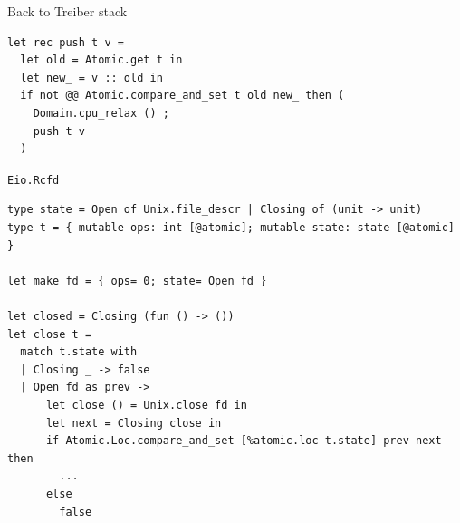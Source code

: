 \begin{frame}[fragile]{Back to Treiber stack}
\Large
\begin{verbatim}
let rec push t v =
  let old = Atomic.get t in
  let new_ = v :: old in
  if not @@ Atomic.compare_and_set t old new_ then (
    Domain.cpu_relax () ;
    push t v
  )
\end{verbatim}
\end{frame}

\begin{frame}[fragile]{\texttt{Eio.Rcfd}}
\begin{verbatim}
type state = Open of Unix.file_descr | Closing of (unit -> unit)
type t = { mutable ops: int [@atomic]; mutable state: state [@atomic] }

let make fd = { ops= 0; state= Open fd }

let closed = Closing (fun () -> ())
let close t =
  match t.state with
  | Closing _ -> false
  | Open fd as prev ->
      let close () = Unix.close fd in
      let next = Closing close in
      if Atomic.Loc.compare_and_set [%atomic.loc t.state] prev next then
        ...
      else
        false
\end{verbatim}
\end{frame}


